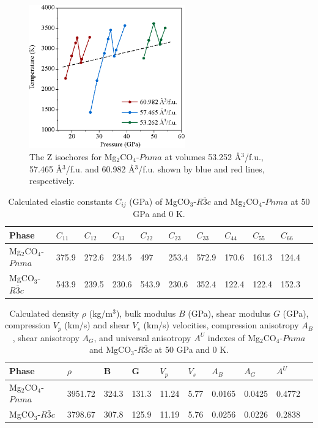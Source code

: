\documentclass[a4paperm]{article}
\begin{document}
\begin{figure}[H]
	\includegraphics[width=0.6\textwidth]{Zcurve} \centering
	\caption{The Z isochores for Mg$_2$CO$_4$-$Pnma$ at volumes 53.252 \AA{$^3$}/f.u., 57.465 \AA{$^3$}/f.u. and 60.982 \AA{$^3$}/f.u. shown by blue and red lines, respectively.} \label{Zcurve}
\end{figure}

	\begin{table}[H]
	\caption{Calculated elastic constants $C_{ij}$ (GPa) of MgCO$_3$-$R\bar{3}c$ and Mg$_2$CO$_4$-$Pnma$ at 50 GPa and 0 K.} \label{elastic_const} \vspace{2mm} 
	\begin{tabular}{l*{10}{l}}
		\hline \hline
Phase	&	$C_{11}$	&	$C_{12}$	&	$C_{13}$	&	$C_{22}$	&	$C_{23}$	&	$C_{33}$	&	$C_{44}$	&	$C_{55}$	&	$C_{66}$	\\
\hline
Mg$_2$CO$_4$-$Pnma$	&	375.9	&	272.6	&	234.5	&	497	&	253.4	&	572.9	&	170.6	&	161.3	&	124.4	\\                                                                                              
MgCO$_3$-$R\bar{3}c$	&	543.9	&	239.5	&	230.6	&	543.9	&	230.6	&	352.4	&	122.4	&	122.4	&	152.3	\\

		\hline \hline
	\end{tabular}
\end{table}

	\begin{table}[H]
	\caption{Calculated density $\rho$ (kg/m$^3$), bulk modulus $B$ (GPa), shear modulus $G$ (GPa), compression $V_p$ (km/s) and shear $V_s$ (km/s) velocities, compression anisotropy $A_B$, shear anisotropy $A_G$, and universal anisotropy $A^U$ indexes of Mg$_2$CO$_4$-$Pnma$ and MgCO$_3$-$R\bar{3}c$ at 50 GPa and 0 K.} \vspace{2mm} \label{moduli}
		\begin{tabular}{l*{9}{l}}
			\hline \hline
					
			Phase	& $\rho$	& B &	G	& $V_p$&  $V_s$ &	$A_B$	&	$A_G$	&	$A^U$	\\
			\hline
			Mg$_2$CO$_4$-$Pnma$	& 3951.72 &	324.3	&	131.3	& 11.24  & 5.77 &	0.0165	&	0.0425	&	0.4772	\\
			MgCO$_3$-$R\bar{3}c$ & 3798.67 &	307.8	&	125.9	& 11.19 & 5.76	&   0.0256	&	0.0226	&	0.2838	\\
			
			\hline \hline
	\end{tabular}
\end{table}
\end{document}
